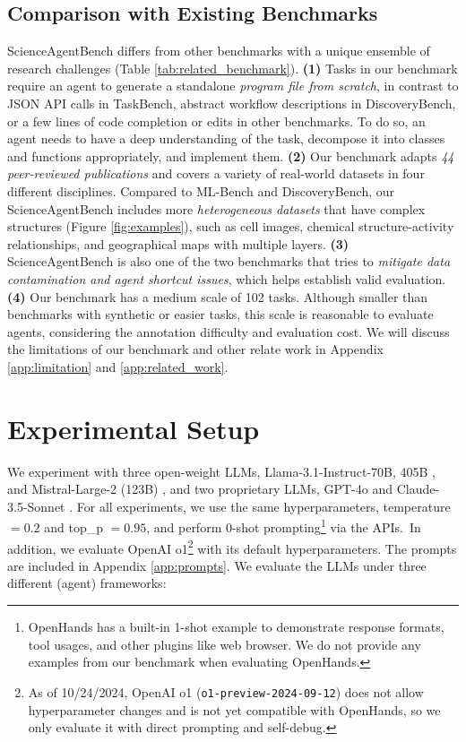\documentclass{article} %
\newcommand{\bench}{ScienceAgentBench\xspace}
\begin{document}
\subsection{Comparison with Existing Benchmarks}
\label{sec:benchmark_comparison}



%
\bench differs from other benchmarks with a unique ensemble of research challenges (Table \ref{tab:related_benchmark}). 
\textbf{(1)} Tasks in our benchmark require an agent to generate a standalone \textit{program file from scratch}, in contrast to JSON API calls in TaskBench, abstract workflow descriptions in DiscoveryBench, or a few lines of code completion or edits in other benchmarks.
To do so, an agent needs to have a deep understanding of the task, decompose it into classes and functions appropriately, and implement them.
\textbf{(2)} Our benchmark adapts \textit{44 peer-reviewed publications} and covers a variety of real-world datasets in four different disciplines.
Compared to ML-Bench and DiscoveryBench, our \bench includes more \textit{heterogeneous datasets} that have complex structures (Figure \ref{fig:examples}), such as cell images, chemical structure-activity relationships, and geographical maps with multiple layers.
\textbf{(3)} \bench is also one of the two benchmarks that tries to \textit{mitigate data contamination and agent shortcut issues}, which helps establish valid evaluation.
\textbf{(4)} Our benchmark has a medium scale of 102 tasks. 
Although smaller than benchmarks with synthetic or easier tasks, this scale is reasonable to evaluate agents, considering the annotation difficulty and evaluation cost. 
We will discuss the limitations of our benchmark and other relate work in Appendix \ref{app:limitation} and \ref{app:related_work}.
%

\section{Experimental Setup}
\label{sec:setup}

%
We experiment with three open-weight LLMs, Llama-3.1-Instruct-70B, 405B \citep{dubey2024llama3herdmodels}, and Mistral-Large-2 (123B) \citep{mistral_large_2}, and two proprietary LLMs, GPT-4o \citep{gpt_4o} and Claude-3.5-Sonnet \citep{claude}.
For all experiments, we use the same hyperparameters, temperature $=0.2$ and top\_p $=0.95$, and perform 0-shot prompting\footnote{OpenHands has a built-in 1-shot example to demonstrate response formats, tool usages, and other plugins like web browser. We do not provide any examples from our benchmark when evaluating OpenHands.} via the APIs.\
In addition, we evaluate OpenAI o1\footnote{As of 10/24/2024, OpenAI o1 (\texttt{o1-preview-2024-09-12}) does not allow hyperparameter changes and is not yet compatible with OpenHands, so we only evaluate it with direct prompting and self-debug.} \citep{openai_o1} with its default hyperparameters.
The prompts are included in Appendix \ref{app:prompts}.
We evaluate the LLMs under three different (agent) frameworks:
%
\end{document}
